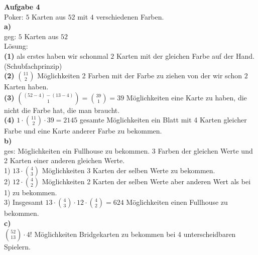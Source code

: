 \documentclass[a4paper]{scrartcl}
\begin{document}
	\begin{flushleft}
		\textbf{Aufgabe 4}\\
		Poker: $5$ Karten aus $52$ mit $4$ verschiedenen Farben.\\[1em]
		\textbf{a)}\\
		geg: $5$ Karten aus $52$\\
		Lösung:\\
		\textbf{(1)} als erstes haben wir schonmal $2$ Karten mit der gleichen Farbe auf der Hand. (Schubfachprinzip)\\
		\textbf{(2)} $\binom{11}{2}$ Möglichkeiten 2 Farben mit der Farbe zu ziehen von der wir schon $2$ Karten haben.\\
		\textbf{(3)} $\binom{(52-4)-(13-4)}{1} = \binom{39}{1} = 39$ Möglichkeiten eine Karte zu haben, die nicht die Farbe hat, die man braucht.\\
		\textbf{(4)} $1\cdot\binom{11}{2}\cdot 39 = 2145$ gesamte Möglichkeiten ein Blatt mit 4 Karten gleicher Farbe und eine Karte anderer Farbe zu bekommen.\\[1em]

		\textbf{b)}\\
		ges: Möglichkeiten ein Fullhouse zu bekommen. 3 Farben der gleichen Werte und 2 Karten einer anderen gleichen Werte.\\[1em]
		1) $13\cdot\binom{4}{3}$ Möglichkeiten 3 Karten der selben Werte zu bekommen.\\
		2) $12\cdot\binom{4}{2}$ Möglichkeiten 2 Karten der selben Werte aber anderen Wert als bei 1) zu bekommen.\\
		3) Insgesamt $13\cdot\binom{4}{3}\cdot 12\cdot\binom{4}{2} = 624$ Möglichkeiten einen Fullhouse zu bekommen.\\[1em]		
		
		\textbf{c)}\\
		$\binom{52}{13}\cdot 4!$ Möglichkeiten Bridgekarten zu bekommen bei 4 unterscheidbaren Spielern.\\[1em]
	\end{flushleft}
\end{document}
